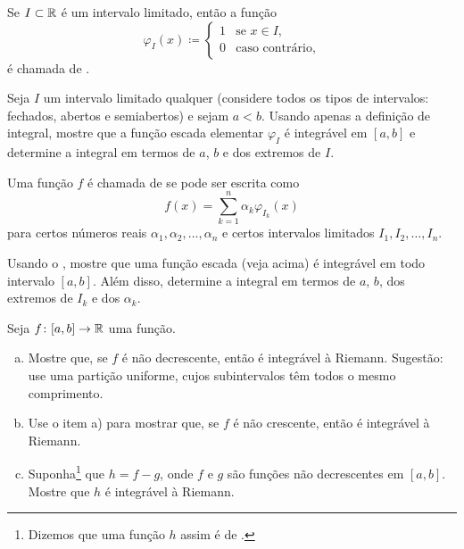\begin{exnote}
Se $I \subset {\mathbb{R}}$ é um intervalo limitado, então a função
\begin{equation*}
\varphi_I(x) \coloneqq
\begin{cases}
1 & \text{se } x \in I, \\
0 & \text{caso contrário,}
\end{cases}
\end{equation*}
é chamada de \emph{}.
\end{exnote}

\begin{exercise} \label{exercise:stepfunctionintegrable}
Seja $I$ um intervalo limitado qualquer (considere todos os tipos de
intervalos: fechados, abertos e semiabertos) e sejam $a < b$. Usando apenas a
definição de integral, mostre que a função escada elementar $\varphi_I$ é
integrável em $[a,b]$ e determine a integral em termos de $a$, $b$ e dos
extremos de $I$.
\end{exercise}

\begin{exnote}
Uma função $f$ é chamada de
\emph{} se pode ser escrita como
\begin{equation*}
f(x) = \sum_{k=1}^n \alpha_k \varphi_{I_k} (x)
\end{equation*}
para certos números reais $\alpha_1,\alpha_2, \ldots, \alpha_n$
e certos intervalos limitados $I_1,I_2,\ldots,I_n$.
\end{exnote}

\begin{exercise}
Usando o , mostre que uma função
escada (veja acima) é integrável em todo intervalo $[a,b]$. Além disso,
determine a integral em termos de $a$, $b$, dos extremos de $I_k$ e dos
$\alpha_k$.
\end{exercise}

\begin{exercise}
\label{exercise:boundedvariationintegrable}
Seja $f \colon [a,b] \to {\mathbb{R}}$ uma função.
\begin{enumerate}[a)]
\item
Mostre que, se $f$ é não decrescente, então é integrável à Riemann.
Sugestão: use uma partição uniforme, cujos subintervalos têm todos o mesmo comprimento.
\item
Use o item a) para mostrar que, se $f$ é não crescente, então é integrável à Riemann.
\item
Suponha\footnote{Dizemos que uma função $h$ assim é de
\emph{}.} que $h = f-g$, onde $f$ e $g$ são
funções não decrescentes em $[a,b]$. Mostre que $h$ é integrável à Riemann.
\end{enumerate}
\end{exercise}

